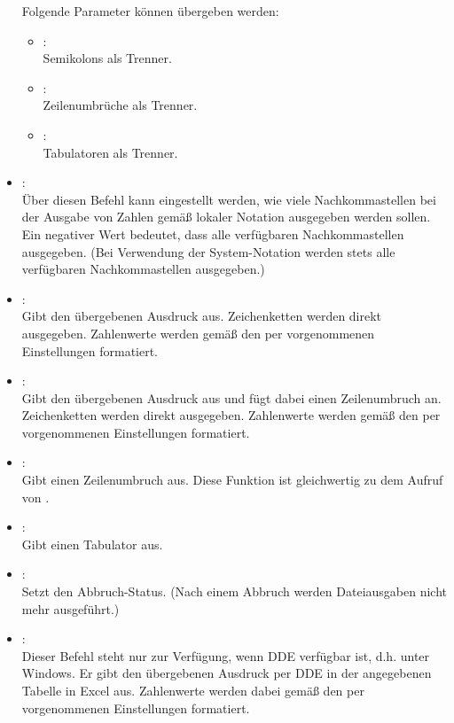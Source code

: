 \begin{itemize}
Folgende Parameter können  übergeben werden:
\begin{itemize}
\item
{}:\\
Semikolons als Trenner.
\item
{}:\\
Zeilenumbrüche als Trenner.
\item
{}:\\
Tabulatoren als Trenner.
\end{itemize}

\item
{}:\\
Über diesen Befehl kann eingestellt werden, wie viele Nachkommastellen bei der
Ausgabe von Zahlen gemäß lokaler Notation ausgegeben werden sollen. Ein
negativer Wert bedeutet, dass alle verfügbaren Nachkommastellen ausgegeben.
(Bei Verwendung der System-Notation werden stets alle verfügbaren Nachkommastellen ausgegeben.)

\item
{}:\\
Gibt den übergebenen Ausdruck aus.
Zeichenketten werden direkt ausgegeben. Zahlenwerte werden gemäß den per
 vorgenommenen Einstellungen formatiert.

\item
{}:\\
Gibt den übergebenen Ausdruck aus und fügt dabei einen Zeilenumbruch an.
Zeichenketten werden direkt ausgegeben. Zahlenwerte werden gemäß den per
 vorgenommenen Einstellungen formatiert.

\item
{}:\\
Gibt einen Zeilenumbruch aus. Diese Funktion ist gleichwertig zu dem Aufruf von
.

\item
{}:\\
Gibt einen Tabulator aus.

\item
{}:\\
Setzt den Abbruch-Status. (Nach einem Abbruch werden Dateiausgaben nicht mehr ausgeführt.)

\item
{}:\\
Dieser  Befehl steht nur zur Verfügung, wenn DDE verfügbar ist, d.h. unter Windows.
Er gibt den übergebenen Ausdruck per DDE in der angegebenen Tabelle in Excel aus.
Zahlenwerte werden dabei gemäß den per  vorgenommenen Einstellungen formatiert.

\end{itemize}



